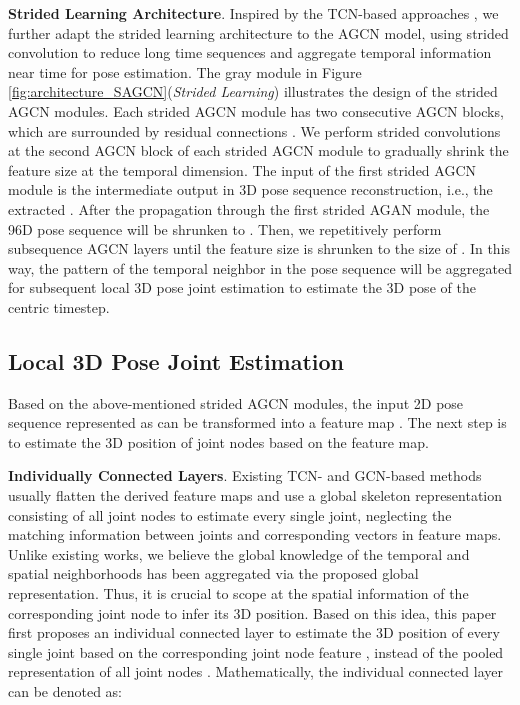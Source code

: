 \documentclass[10pt,twocolumn,letterpaper]{article}
\begin{document}
\noindent \textbf{Strided Learning Architecture}. Inspired by the TCN-based approaches \cite{RN012,RN013}, we further adapt the strided learning architecture to the AGCN model, using strided convolution to reduce long time sequences and aggregate temporal information near time  for pose estimation. The gray module in Figure \ref{fig:architecture_SAGCN}(\textit{Strided Learning}) illustrates the design of the strided AGCN modules. Each strided AGCN module has two consecutive AGCN blocks, which are surrounded by residual connections \cite{he2016deep}. We perform strided convolutions at the second AGCN block of each strided AGCN module to gradually shrink the feature size at the temporal dimension. The input of the first strided AGCN module is the intermediate output in 3D pose sequence reconstruction, i.e., the extracted . After the propagation through the first strided AGAN module, the 96D pose sequence will be shrunken to . Then, we repetitively perform subsequence AGCN layers until the feature size is shrunken to the size of . In this way, the pattern of the temporal neighbor in the pose sequence will be aggregated for subsequent local 3D pose joint estimation to estimate the 3D pose of the centric timestep.

\subsection{Local 3D Pose Joint Estimation}
Based on the above-mentioned strided AGCN modules, the input 2D pose sequence represented as  can be transformed into a feature map . The next step is to estimate the 3D position of joint nodes based on the feature map.

\noindent \textbf{Individually Connected Layers}. Existing TCN- and GCN-based methods \cite{RN012,RN013,RN018,RN014} usually flatten the derived feature maps and use a global skeleton representation consisting of all joint nodes to estimate every single joint, neglecting the matching information between joints and corresponding vectors in feature maps. Unlike existing works, we believe the global knowledge of the temporal and spatial neighborhoods has been aggregated via the proposed global representation. Thus, it is crucial to scope at the spatial information of the corresponding joint node to infer its 3D position. Based on this idea, this paper first proposes an individual connected layer to estimate the 3D position of every single joint based on the corresponding joint node feature , instead of the pooled representation of all joint nodes . Mathematically, the individual connected layer can be denoted as:
\end{document}
